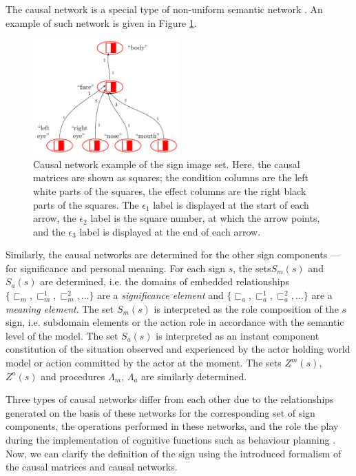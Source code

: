 \documentclass[review]{elsarticle}
\begin{document}
The causal network is a special type of non-uniform semantic network \cite{Osipov1990}. An example of such network is given in Figure \ref{fig:caus_net}.

\begin{figure}[h]
	\centering
	\includegraphics[width=0.5\textwidth,page=1]{examples/causnet/en/caus_net_colored_en}
	\caption{Causal network example of the sign image set. Here, the causal matrices are shown as squares; the condition columns are the left white parts of the squares, the effect columns are the right black parts of the squares. The $\epsilon_1$ label is displayed at the start of each arrow, the $\epsilon_2$ label is the square number, at which the arrow points, and the $\epsilon_3$ label is displayed at the end of each arrow.}
	\label{fig:caus_net}		
\end{figure}

Similarly, the causal networks are determined for the other sign components --- for significance and personal meaning. For each sign $s$, the sets$S_m(s)$ and $S_a(s)$ are determined, i.e. the domains of embedded relationships $\{\sqsubset_m,\sqsubset_m^1,\sqsubset_m^2,\dots\}$ are a \textit{significance element} and $\{\sqsubset_a,\sqsubset_a^1,\sqsubset_a^2,\dots\}$ are a \textit{meaning element}. The set $S_m(s)$ is interpreted as the role composition of the $s$ sign, i.e. subdomain elements or the action role in accordance with the semantic level of the model. The set $S_a(s)$ is interpreted as an instant component constitution of the situation observed and experienced by the actor holding world model or action committed by the actor at the moment. The sets $Z^m(s)$, $Z^a(s)$ and procedures $\Lambda_m$, $\Lambda_a$ are similarly determined.

Three types of causal networks differ from each other due to the relationships generated on the basis of these networks for the corresponding set of sign components, the operations performed in these networks, and the role the play during the implementation of cognitive functions such as behaviour planning \cite{Osipov2015d,Panov2017a}. Now, we can clarify the definition of the sign \cite{Osipov2015c} using the introduced formalism of the causal matrices and causal networks.
\end{document}
